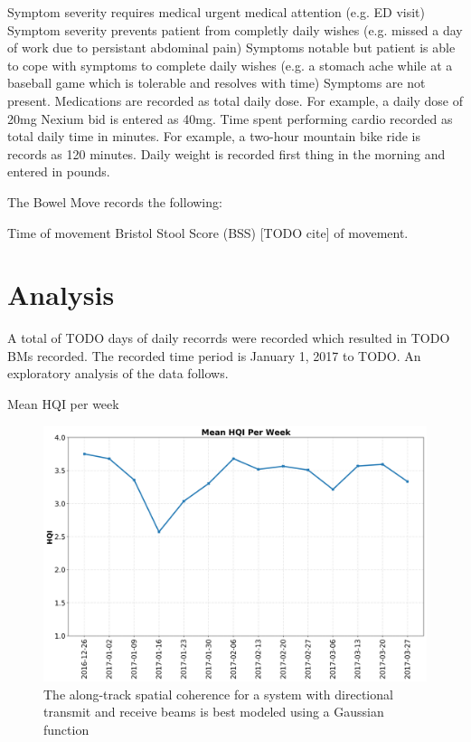 \documentclass[conference]{IEEEtran}
\begin{document}
Symptom severity requires medical urgent medical attention (e.g. ED visit)
Symptom severity prevents patient from completly daily wishes (e.g. missed a day of work due to persistant abdominal pain)
Symptoms notable but patient is able to cope with symptoms to complete daily wishes (e.g. a stomach ache while at a baseball game which is tolerable and resolves with time)
Symptoms are not present.
Medications are recorded as total daily dose.  For example, a daily dose of 20mg Nexium bid is entered as 40mg. Time spent performing cardio recorded as total daily time in minutes.  For example, a two-hour mountain bike ride is records as 120 minutes. Daily weight is recorded first thing in the morning and entered in pounds.

The Bowel Move records the following:

Time of movement
Bristol Stool Score (BSS) [TODO cite] of movement.

\section{Analysis}

A total of TODO days of daily recorrds were recorded which resulted in TODO BMs recorded.  The recorded time period is January 1, 2017 to TODO.  An exploratory analysis of the data follows.

Mean HQI per week

\begin{figure}[t]
    \centering
    \includegraphics[width=\columnwidth]{hqi.png}
    \caption{The along-track spatial coherence for a system with directional transmit and receive beams is best modeled using a Gaussian function}\label{fig:mean_hqi}
\end{figure}
\end{document}
